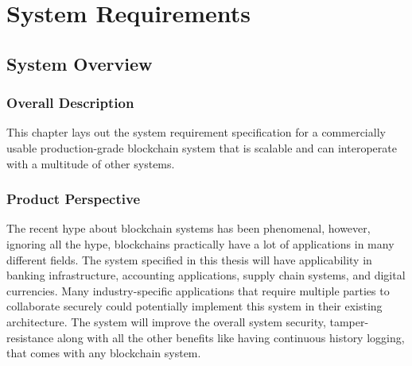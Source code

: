 \documentclass[a4paper,twoside,phd]{BYUPhys}
\begin{document}
\chapter{System Requirements}
\label{chap:singleuser}

\section{System Overview \label{sec:Intro-ChapUserSelec}}
\subsection{Overall Description}
This chapter lays out the system requirement specification for a commercially usable production-grade blockchain system that is scalable and can interoperate with a multitude of other systems.
\subsection{Product Perspective}
The recent hype about blockchain systems has been phenomenal, however, ignoring all the hype, blockchains practically have a lot of applications in many different fields. The system specified in this thesis will have applicability in banking infrastructure, accounting applications, supply chain systems, and digital currencies. Many industry-specific applications that require multiple parties to collaborate securely could potentially implement this system in their existing architecture. The system will improve the overall system security, tamper-resistance along with all the other benefits like having continuous history logging, that comes with any blockchain system.
\end{document}
